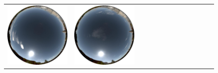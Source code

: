 \begin{figure}
\begin{tabular}{@{}rcccccccccccc@{}}
    \includegraphics[width=\customwidth]{./figures/database/20131106_115943.jpg} &
    \includegraphics[width=\customwidth]{./figures/database/20131106_122939.jpg} &

\end{tabular}
\end{figure}
